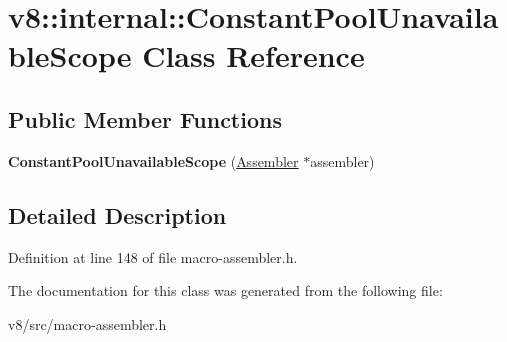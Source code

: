 \hypertarget{classv8_1_1internal_1_1ConstantPoolUnavailableScope}{}\section{v8\+:\+:internal\+:\+:Constant\+Pool\+Unavailable\+Scope Class Reference}
\label{classv8_1_1internal_1_1ConstantPoolUnavailableScope}
\subsection*{Public Member Functions}
\begin{DoxyCompactItemize}
\item 
\mbox{\label{classv8_1_1internal_1_1ConstantPoolUnavailableScope_aefe98b03d8a3084f81ba719cf56d4d19}} 
{\bfseries Constant\+Pool\+Unavailable\+Scope} (\mbox{\hyperlink{classv8_1_1internal_1_1Assembler}{Assembler}} $\ast$assembler)
\end{DoxyCompactItemize}


\subsection{Detailed Description}


Definition at line 148 of file macro-\/assembler.\+h.



The documentation for this class was generated from the following file\+:\begin{DoxyCompactItemize}
\item 
v8/src/macro-\/assembler.\+h\end{DoxyCompactItemize}
